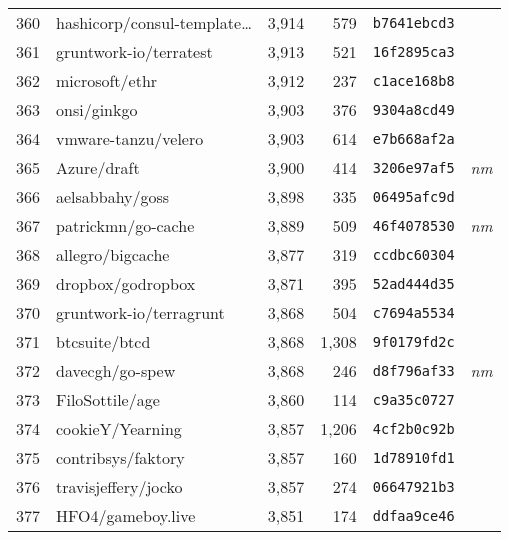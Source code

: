 {\begin{supertabular}{llrrll}
        360 &    hashicorp/consul-template\ldots &  3,914 &    579 &  \texttt{b7641ebcd3} &              \\
        361 &             gruntwork-io/terratest &  3,913 &    521 &  \texttt{16f2895ca3} &              \\
        362 &                     microsoft/ethr &  3,912 &    237 &  \texttt{c1ace168b8} &              \\
        363 &                        onsi/ginkgo &  3,903 &    376 &  \texttt{9304a8cd49} &              \\
        364 &                vmware-tanzu/velero &  3,903 &    614 &  \texttt{e7b668af2a} &              \\
        365 &                        Azure/draft &  3,900 &    414 &  \texttt{3206e97af5} &  \textit{nm} \\
        366 &                    aelsabbahy/goss &  3,898 &    335 &  \texttt{06495afc9d} &              \\
        367 &                 patrickmn/go-cache &  3,889 &    509 &  \texttt{46f4078530} &  \textit{nm} \\
        368 &                   allegro/bigcache &  3,877 &    319 &  \texttt{ccdbc60304} &              \\
        369 &                  dropbox/godropbox &  3,871 &    395 &  \texttt{52ad444d35} &              \\
        370 &            gruntwork-io/terragrunt &  3,868 &    504 &  \texttt{c7694a5534} &              \\
        371 &                      btcsuite/btcd &  3,868 &  1,308 &  \texttt{9f0179fd2c} &              \\
        372 &                    davecgh/go-spew &  3,868 &    246 &  \texttt{d8f796af33} &  \textit{nm} \\
        373 &                    FiloSottile/age &  3,860 &    114 &  \texttt{c9a35c0727} &              \\
        374 &                   cookieY/Yearning &  3,857 &  1,206 &  \texttt{4cf2b0c92b} &              \\
        375 &                 contribsys/faktory &  3,857 &    160 &  \texttt{1d78910fd1} &              \\
        376 &                travisjeffery/jocko &  3,857 &    274 &  \texttt{06647921b3} &              \\
        377 &                  HFO4/gameboy.live &  3,851 &    174 &  \texttt{ddfaa9ce46} &              \\

\end{supertabular}}
